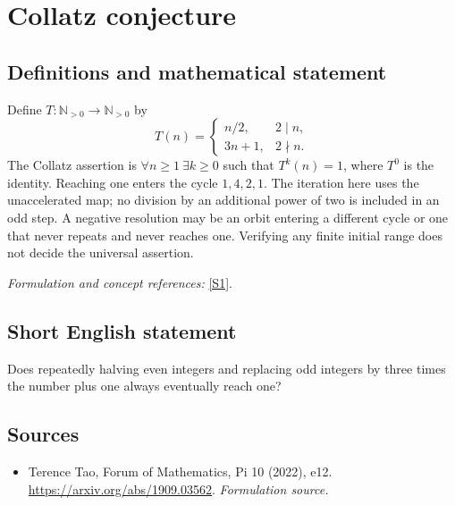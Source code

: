 \documentclass[11pt]{article}
\begin{document}
\section*{\texorpdfstring{Collatz conjecture}{Collatz conjecture}}\label{188}
\subsection{Definitions and mathematical statement}
Define $T:{\mathbb{N}}_{>0}\to{\mathbb{N}}_{>0}$ by
\[
 T(n)=\begin{cases}n/2,&2\mid n,\\3n+1,&2\nmid n.\end{cases}
\]
The Collatz assertion is $\forall n\ge1\ \exists k\ge0$ such that $T^k(n)=1$, where $T^0$ is the identity. Reaching one enters the cycle $1,4,2,1$. The iteration here uses the unaccelerated map; no division by an additional power of two is included in an odd step. A negative resolution may be an orbit entering a different cycle or one that never repeats and never reaches one. Verifying any finite initial range does not decide the universal assertion.
\par\smallskip\textit{Formulation and concept references:} \href{https://arxiv.org/abs/1909.03562}{[S1]}.

\subsection{Short English statement}
Does repeatedly halving even integers and replacing odd integers by three times the number plus one always eventually reach one?
\subsection{Sources}
\begin{itemize}
\item[S1]Terence Tao, Forum of Mathematics, Pi 10 (2022), e12.
\url{https://arxiv.org/abs/1909.03562}.
\textit{Formulation source.}
\end{itemize}
\end{document}

